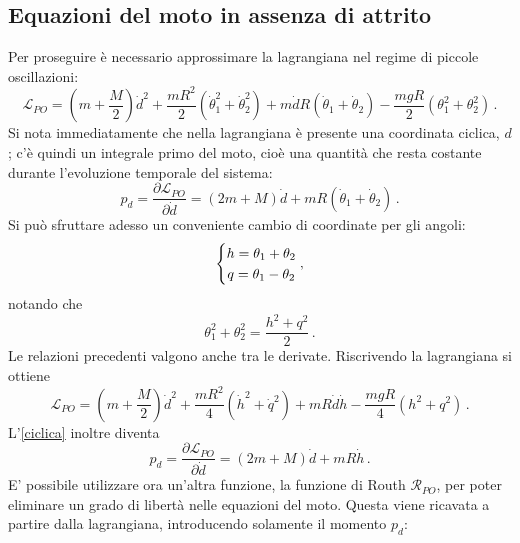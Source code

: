 \documentclass[11pt, a4paper, twoside, italian]{article}
\begin{document}
\subsection{Equazioni del moto in assenza di attrito}
Per proseguire è necessario approssimare
la lagrangiana nel regime di piccole oscillazioni:
\begin{equation}
\mathcal{L}_{PO} =  \left(m+ \frac{M}{2}\right) \dot{d}^2 + \frac{m R^2}{2}  (\dot\theta_1^2 + \dot\theta_2^2) + m \dot{d} R (\dot \theta_1 + \dot \theta_2) - \frac{m gR}{2} (\theta_1^2 + \theta_2^2) \, .
\label{lagrangianapo}
\end{equation}
Si nota immediatamente che nella lagrangiana è presente una coordinata ciclica, $d$; c'è
 quindi un integrale primo del moto, cioè una quantità che resta costante durante 
l'evoluzione temporale del sistema:
\begin{equation}
p_d = \frac{\partial \mathcal{L}_{PO}}{\partial \dot{d}} =(2m+M) \dot d + m R (\dot\theta_1 + \dot \theta_2) \, .
\label{ciclica}
\end{equation}
Si può sfruttare adesso un conveniente cambio di coordinate per gli angoli:
\begin{equation}
\setlength\arraycolsep{0pt}
\renewcommand\arraystretch{1.25}
\left\{
\begin{array}{c}
h = \theta_1 + \theta_2  \\
q = \theta_1 - \theta_2
\end{array}
\right.
,
\label{definizionehq}
\end{equation}
notando che
\begin{equation*}
  \theta_1^2 + \theta_2^2 = \frac{h^2 +q^2}{2} \, .
\end{equation*}
Le relazioni precedenti valgono anche tra le derivate.
Riscrivendo la lagrangiana si ottiene
\begin{equation*}
\mathcal{L}_{PO} =  \left(m+ \frac{M}{2}\right) \dot{d}^2 + \frac{mR^2}{4}  (\dot{h}^2 + \dot{q}^2) + m  R \dot{d}\dot{h} - \frac{mgR}{4}(h^2 + q^2) \, .
\end{equation*}
L'\cref{ciclica} inoltre diventa 
\begin{equation*}
  p_d = \frac{\partial \mathcal{L}_{PO}}{\partial \dot{d}} =(2m+M) \dot d + m R \dot h \, .
\end{equation*}
E' possibile utilizzare ora un'altra funzione, la funzione di Routh $\mathcal{R}_{PO}$, per poter eliminare 
un grado di libertà nelle equazioni del moto. Questa viene ricavata a partire dalla lagrangiana, introducendo solamente il
momento $p_d$:
\end{document}
